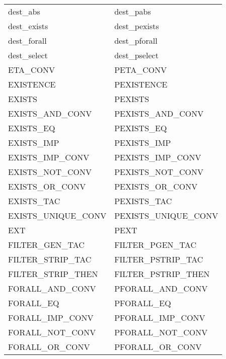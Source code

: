 {\begin{center}
\begin{tabular}[t]{|l|l|}
        dest\_abs                   &   dest\_pabs                  \\
        dest\_exists                &   dest\_pexists               \\
        dest\_forall                &   dest\_pforall               \\
        dest\_select                &   dest\_pselect               \\
        ETA\_CONV                   &   PETA\_CONV                  \\
        EXISTENCE                   &   PEXISTENCE                  \\
        EXISTS                      &   PEXISTS                     \\
        EXISTS\_AND\_CONV           &   PEXISTS\_AND\_CONV          \\
        EXISTS\_EQ                  &   PEXISTS\_EQ                 \\
        EXISTS\_IMP                 &   PEXISTS\_IMP                \\
        EXISTS\_IMP\_CONV           &   PEXISTS\_IMP\_CONV          \\
        EXISTS\_NOT\_CONV           &   PEXISTS\_NOT\_CONV          \\
        EXISTS\_OR\_CONV            &   PEXISTS\_OR\_CONV           \\
        EXISTS\_TAC                 &   PEXISTS\_TAC                \\
        EXISTS\_UNIQUE\_CONV        &   PEXISTS\_UNIQUE\_CONV       \\
        EXT                         &   PEXT                        \\
        FILTER\_GEN\_TAC            &   FILTER\_PGEN\_TAC           \\
        FILTER\_STRIP\_TAC          &   FILTER\_PSTRIP\_TAC         \\
        FILTER\_STRIP\_THEN         &   FILTER\_PSTRIP\_THEN        \\
        FORALL\_AND\_CONV           &   PFORALL\_AND\_CONV          \\
        FORALL\_EQ                  &   PFORALL\_EQ                 \\
        FORALL\_IMP\_CONV           &   PFORALL\_IMP\_CONV          \\
        FORALL\_NOT\_CONV           &   PFORALL\_NOT\_CONV          \\
        FORALL\_OR\_CONV            &   PFORALL\_OR\_CONV           \\

\end{tabular}
\end{center}}
